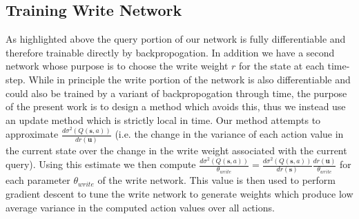 \documentclass{article}
\begin{document}
\subsection*{Training Write Network}
As highlighted above the query portion of our network is fully differentiable and therefore trainable directly by backpropogation. In addition we have a second network whose purpose is to choose the write weight $r$ for the state at each time-step. While in principle the write portion of the network is also differentiable and could also be trained by a variant of backpropogation through time, the purpose of the present work is to design a method which avoids this, thus we instead use an update method which is strictly local in time. Our method attempts to approximate $\frac{d\sigma^2(Q(\pmb{s},a))}{dr(\pmb{u})}$ (i.e. the change in the variance of each action value in the current state over the change in the write weight associated with the current query). Using this estimate we then compute $\frac{d\sigma^2(Q(\pmb{s},a))}{\theta_{write}}=\frac{d\sigma^2(Q(\pmb{s},a))}{dr(\pmb{s})}\frac{dr(\pmb{u})}{\theta_{write}}$ for each parameter $\theta_{write}$ of the write network. This value is then used to perform gradient descent to tune the write network to generate weights which produce low average variance in the computed action values over all actions.
\end{document}
